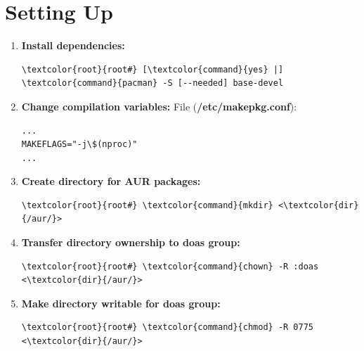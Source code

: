 \documentclass[10pt, a4paper, onecolumn, oneside, titlepage, openany]{book}
\begin{document}
\section{Setting Up}
\begin{enumerate}
    \item \textbf{Install dependencies:}
\begin{Verbatim}[commandchars=\\\{\}]
\textcolor{root}{root#} [\textcolor{command}{yes} |] \textcolor{command}{pacman} -S [--needed] base-devel
\end{Verbatim} 
    \item \textbf{Change compilation variables:}
\newline File (\textbf{\textcolor{file}{/etc/makepkg.conf}}):
\begin{Verbatim}[commandchars=\\\{\}]
...
MAKEFLAGS="-j\$(nproc)"
...
\end{Verbatim}
    \item \textbf{Create directory for AUR packages:}
\begin{Verbatim}[commandchars=\\\{\}]
\textcolor{root}{root#} \textcolor{command}{mkdir} <\textcolor{dir}{/aur/}>
\end{Verbatim}
    \item \textbf{Transfer directory ownership to doas group:}
\begin{Verbatim}[commandchars=\\\{\}]
\textcolor{root}{root#} \textcolor{command}{chown} -R :doas <\textcolor{dir}{/aur/}>
\end{Verbatim}
    \item \textbf{Make directory writable for doas group:}
\begin{Verbatim}[commandchars=\\\{\}]
\textcolor{root}{root#} \textcolor{command}{chmod} -R 0775 <\textcolor{dir}{/aur/}>
\end{Verbatim}
\end{enumerate}
\end{document}
